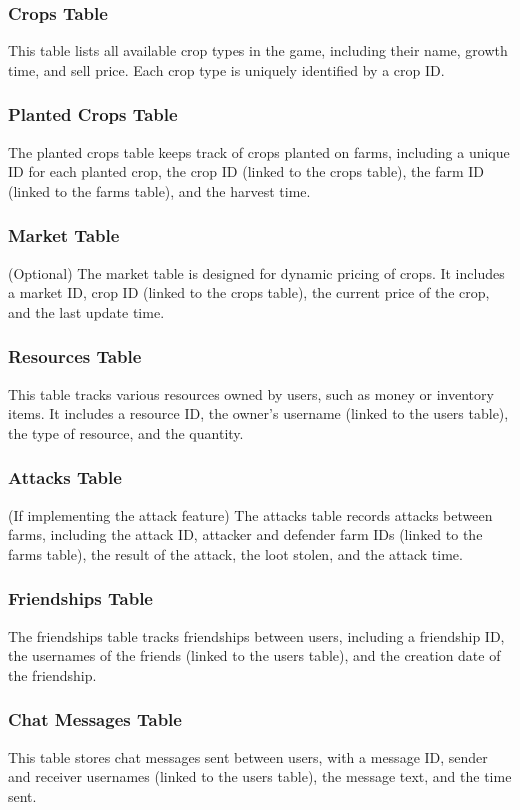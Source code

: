\documentclass[12pt]{article}
\begin{document}
\subsubsection{Crops Table}
This table lists all available crop types in the game, including their name, growth time, and sell price. Each crop type is uniquely identified by a crop ID.

\subsubsection{Planted Crops Table}
The planted \textunderscore crops table keeps track of crops planted on farms, including a unique ID for each planted crop, the crop ID (linked to the crops table), the farm ID (linked to the farms table), and the harvest time.

\subsubsection{Market Table}
(Optional) The market table is designed for dynamic pricing of crops. It includes a market ID, crop ID (linked to the crops table), the current price of the crop, and the last update time.

\subsubsection{Resources Table}
This table tracks various resources owned by users, such as money or inventory items. It includes a resource ID, the owner's username (linked to the users table), the type of resource, and the quantity.

\subsubsection{Attacks Table}
(If implementing the attack feature) The attacks table records attacks between farms, including the attack ID, attacker and defender farm IDs (linked to the farms table), the result of the attack, the loot stolen, and the attack time.

\subsubsection{Friendships Table}
The friendships table tracks friendships between users, including a friendship ID, the usernames of the friends (linked to the users table), and the creation date of the friendship.

\subsubsection{Chat Messages Table}
This table stores chat messages sent between users, with a message ID, sender and receiver usernames (linked to the users table), the message text, and the time sent.
\end{document}

